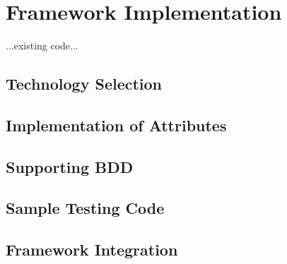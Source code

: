 
\chapter{Framework Implementation\label{chap:framework_implementation}}

...existing code...

\section{Technology Selection}


\section{Implementation of Attributes}


\section{Supporting BDD}




\section{Sample Testing Code}


\section{Framework Integration}

